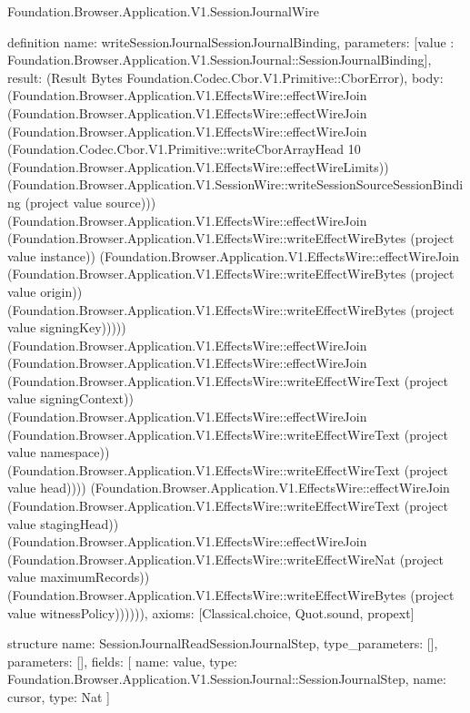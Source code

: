 \begin{lexlean}{Foundation.Browser.Application.V1.SessionJournalWire}
\begin{semanticmodule}
definition{
  name: writeSessionJournalSessionJournalBinding,
  parameters: [value : Foundation.Browser.Application.V1.SessionJournal::SessionJournalBinding],
  result: (Result Bytes Foundation.Codec.Cbor.V1.Primitive::CborError),
  body: (Foundation.Browser.Application.V1.EffectsWire::effectWireJoin (Foundation.Browser.Application.V1.EffectsWire::effectWireJoin (Foundation.Browser.Application.V1.EffectsWire::effectWireJoin (Foundation.Codec.Cbor.V1.Primitive::writeCborArrayHead 10 (Foundation.Browser.Application.V1.EffectsWire::effectWireLimits)) (Foundation.Browser.Application.V1.SessionWire::writeSessionSourceSessionBinding (project value source))) (Foundation.Browser.Application.V1.EffectsWire::effectWireJoin (Foundation.Browser.Application.V1.EffectsWire::writeEffectWireBytes (project value instance)) (Foundation.Browser.Application.V1.EffectsWire::effectWireJoin (Foundation.Browser.Application.V1.EffectsWire::writeEffectWireBytes (project value origin)) (Foundation.Browser.Application.V1.EffectsWire::writeEffectWireBytes (project value signingKey))))) (Foundation.Browser.Application.V1.EffectsWire::effectWireJoin (Foundation.Browser.Application.V1.EffectsWire::effectWireJoin (Foundation.Browser.Application.V1.EffectsWire::writeEffectWireText (project value signingContext)) (Foundation.Browser.Application.V1.EffectsWire::effectWireJoin (Foundation.Browser.Application.V1.EffectsWire::writeEffectWireText (project value namespace)) (Foundation.Browser.Application.V1.EffectsWire::writeEffectWireText (project value head)))) (Foundation.Browser.Application.V1.EffectsWire::effectWireJoin (Foundation.Browser.Application.V1.EffectsWire::writeEffectWireText (project value stagingHead)) (Foundation.Browser.Application.V1.EffectsWire::effectWireJoin (Foundation.Browser.Application.V1.EffectsWire::writeEffectWireNat (project value maximumRecords)) (Foundation.Browser.Application.V1.EffectsWire::writeEffectWireBytes (project value witnessPolicy)))))),
  axioms: [Classical.choice, Quot.sound, propext]
}

structure{
  name: SessionJournalReadSessionJournalStep,
  type_parameters: [],
  parameters: [],
  fields: [
    {name: value, type: Foundation.Browser.Application.V1.SessionJournal::SessionJournalStep},
    {name: cursor, type: Nat}
  ]
}


\end{semanticmodule}
\end{lexlean}

